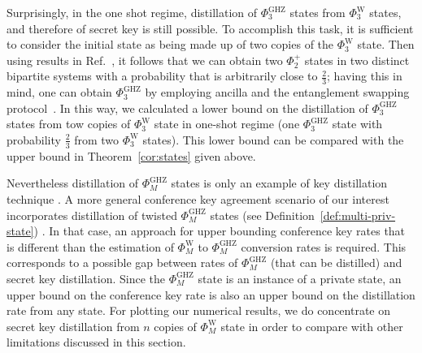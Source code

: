 \documentclass[aps,pra,twocolumn,superscriptaddress,longbibliography]{revtex4-1}
\begin{document}
Surprisingly, in the one shot regime, distillation of $\Phi_3^\mathrm{GHZ}$ states from $\Phi_3^\mathrm{W}$ states, and
therefore of secret key is still possible. To accomplish this task, it
is sufficient to consider the initial state as being made up of two copies of the $\Phi_3^\mathrm{W}$ state. Then using results in Ref.~\cite{FL-2007}, it follows that we can obtain two $\Phi_2^+$ states in two distinct bipartite systems with a probability that is arbitrarily close to $\frac 23$; having this in mind, one can obtain $\Phi_3^\mathrm{GHZ}$ by employing ancilla and the entanglement swapping protocol~\cite{PhysRevLett.71.4287}. In this way, we calculated a lower bound on the distillation of $\Phi_3^\mathrm{GHZ}$ states from tow copies of $\Phi_3^\mathrm{W}$ state in one-shot regime (one $\Phi_3^\mathrm{GHZ}$ state with probability $\frac 23$ from two $\Phi_3^\mathrm{W}$ states). This lower bound can be compared with the upper bound in Theorem~\ref{cor:states} given above. 

Nevertheless distillation of $\Phi_M^\mathrm{GHZ}$ states is only an example of key distillation technique \cite{Cabello2000,Scarani2001,Chen2005,AH09,Augusiak2009W,Grasselli2019,vrana2015asymptotic,vrana2019distillation}. A more general conference key agreement scenario of our interest incorporates distillation of twisted $\Phi_M^\mathrm{GHZ}$ states (see Definition~\ref{def:multi-priv-state}) \cite{Pankowski2008,HHHH09,AH09,Pankowski2010,bauml2017fundamental}. In that case, an approach for upper bounding conference key rates that is different than the estimation of $\Phi_M^\mathrm{W}$ to $\Phi_M^\mathrm{GHZ}$ conversion rates is required. This corresponds to a possible gap between rates of $\Phi_M^\mathrm{GHZ}$ (that can be distilled) and secret key distillation. Since the $\Phi_M^\mathrm{GHZ}$ state is an instance of a private state, an upper bound on the conference key rate is also an upper bound on the distillation rate from any state. For plotting our numerical results, we do concentrate on secret key distillation from $n$ copies of $\Phi_M^\mathrm{W}$ state in order to compare with other limitations discussed in this section.   
\end{document}
